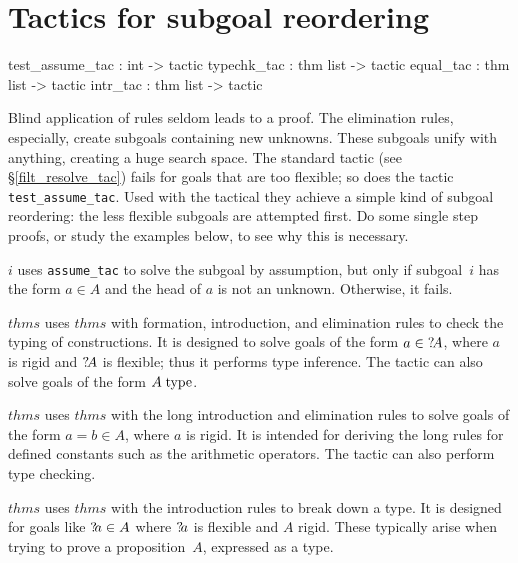 \section{Tactics for subgoal reordering}
\begin{ttbox}
test_assume_tac : int -> tactic
typechk_tac     : thm list -> tactic
equal_tac       : thm list -> tactic
intr_tac        : thm list -> tactic
\end{ttbox}
Blind application of {\CTT} rules seldom leads to a proof.  The elimination
rules, especially, create subgoals containing new unknowns.  These subgoals
unify with anything, creating a huge search space.  The standard tactic
(see %
        {\S\ref{filt_resolve_tac}})
%
fails for goals that are too flexible; so does the {\CTT} tactic {\tt
  test_assume_tac}.  Used with the tactical  they
achieve a simple kind of subgoal reordering: the less flexible subgoals are
attempted first.  Do some single step proofs, or study the examples below,
to see why this is necessary.
\begin{ttdescription}
\item[\ttindexbold{test_assume_tac} $i$] 
uses {\tt assume_tac} to solve the subgoal by assumption, but only if
subgoal~$i$ has the form $a\in A$ and the head of $a$ is not an unknown.
Otherwise, it fails.

\item[\ttindexbold{typechk_tac} $thms$] 
uses $thms$ with formation, introduction, and elimination rules to check
the typing of constructions.  It is designed to solve goals of the form
$a\in {?\!A}$, where $a$ is rigid and ${?\!A}$ is flexible; thus it
performs type inference.  The tactic can also solve goals of
the form $A\;\rm type$.

\item[\ttindexbold{equal_tac} $thms$]
uses $thms$ with the long introduction and elimination rules to solve goals
of the form $a=b\in A$, where $a$ is rigid.  It is intended for deriving
the long rules for defined constants such as the arithmetic operators.  The
tactic can also perform type checking.

\item[\ttindexbold{intr_tac} $thms$]
uses $thms$ with the introduction rules to break down a type.  It is
designed for goals like ${?\!a}\in A$ where ${?\!a}$ is flexible and $A$
rigid.  These typically arise when trying to prove a proposition~$A$,
expressed as a type.
\end{ttdescription}



